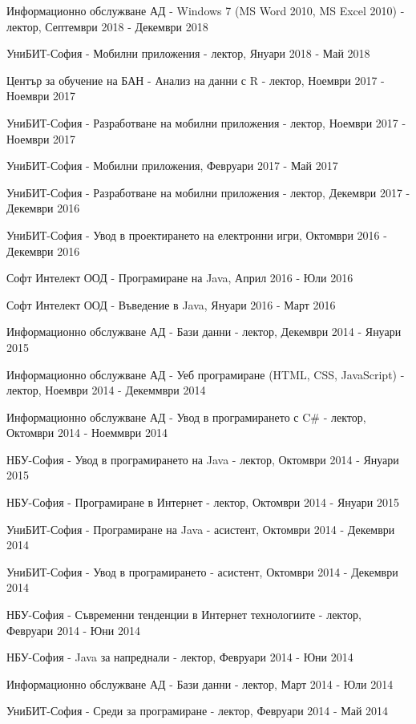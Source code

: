 \documentclass[bulgarian,a4paper]{europasscv}
\begin{document}
\begin{europasscv}
{\begin{ecvitemize}
    \item Информационно обслужване АД - Windows 7 (MS Word 2010, MS Excel 2010) - лектор, Септември 2018 - Декември 2018
    \item УниБИТ-София - Мобилни приложения - лектор, Януари 2018 - Май 2018
    \item Център за обучение на БАН - Анализ на данни с R - лектор, Ноември 2017 - Ноември 2017
    \item УниБИТ-София - Разработване на мобилни приложения - лектор, Ноември 2017 - Ноември 2017
    \item УниБИТ-София - Мобилни приложения, Февруари 2017 - Май 2017
    \item УниБИТ-София - Разработване на мобилни приложения - лектор, Декември 2017 - Декември 2016
    \item УниБИТ-София - Увод в проектирането на електронни игри, Октомври 2016 - Декември 2016
    \item Софт Интелект ООД  - Програмиране на Java, Април 2016 - Юли 2016
    \item Софт Интелект ООД  - Въведение в Java, Януари 2016 - Март 2016
    \item Информационно обслужване АД - Бази данни - лектор, Декември 2014 - Януари 2015
    \item Информационно обслужване АД - Уеб програмиране (HTML, CSS, JavaScript) - лектор, Ноември 2014 - Декеммври 2014
    \item Информационно обслужване АД - Увод в програмирането с C\# - лектор, Октомври 2014 - Ноеммври 2014
    \item НБУ-София - Увод в програмирането на Java - лектор, Октомври 2014 - Януари 2015
    \item НБУ-София - Програмиране в Интернет - лектор, Октомври 2014 - Януари 2015
    \item УниБИТ-София - Програмиране на Java - асистент, Октомври 2014 - Декември 2014
    \item УниБИТ-София - Увод в програмирането - асистент, Октомври 2014 - Декември 2014
    \item НБУ-София - Съвременни тенденции в Интернет технологиите - лектор, Февруари 2014 - Юни 2014
    \item НБУ-София - Java за напреднали - лектор, Февруари 2014 - Юни 2014
    \item Информационно обслужване АД - Бази данни - лектор, Март 2014 - Юли 2014
    \item УниБИТ-София - Среди за програмиране - лектор, Февруари 2014 - Май 2014

\end{ecvitemize}}
\end{europasscv}
\end{document}
